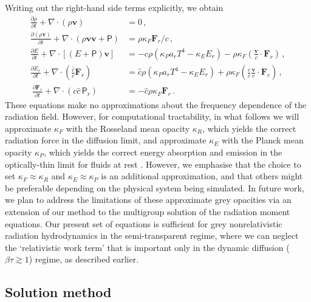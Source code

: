 \documentclass[fleqn,usenatbib]{mnras}
\newcommand{\vc}[1]{{\mathbf{#1}}}
\begin{document}
Writing out the right-hand side terms explicitly, we obtain
\begin{align}
    \label{eq:hydro_continuity}
    \frac{\partial \rho}{\partial t} + \nabla \cdot (\rho \vc{v}) &= 0 \, , \\
    \label{eq:hydro_momentum}
    \frac{\partial (\rho \vc{v})}{\partial t} + \nabla \cdot (\rho \vc{v} \vc{v} + \mathsf{P}) &= \rho \kappa_F {\vc{F}_r / c} \, , \\
    \label{eq:hydro_energy}
    \frac{\partial E}{\partial t} + \nabla \cdot \left[(E + \mathsf{P})\vc{v}\right] &= -c \rho (\kappa_P a_r T^4 - \kappa_E E_r) - \rho \kappa_F \left( \frac{\vc{v}}{c} \cdot \vc{F}_r \right) \, , \\
    \label{eq:rad_energy}
    \frac{\partial E_r}{\partial t} + \nabla \cdot \left( \frac{\hat c}{c} \vc{F}_r \right) &= \hat c \rho \left(\kappa_P a_r T^4 - \kappa_E E_r \right) + \rho \kappa_F \left( \frac{\hat c}{c} \frac{\vc{v}}{c} \cdot \vc{F}_r \right) \, , \\\
    \label{eq:rad_flux}
    \frac{\partial \vc{F}_r}{\partial t} + \nabla \cdot (c \hat c \, \mathsf{P}_r) &= -\hat c \rho \kappa_F \vc{F}_r \, .
\end{align}
These equations make no approximations about the frequency dependence of the radiation field. However, for computational tractability, in what follows we will approximate $\kappa_F$ with the Rosseland mean opacity $\kappa_R$, which yields the correct radiation force in the diffusion limit, and approximate $\kappa_E$ with the Planck mean opacity $\kappa_P$, which yields the correct energy absorption and emission in the optically-thin limit for fluids at rest \citep{Mihalas_1984}. However, we emphasise that the choice to set $\kappa_F \approx \kappa_R$ and $\kappa_E \approx \kappa_P$ is an additional approximation, and that others might be preferable depending on the physical system being simulated.  In future work, we plan to address the limitations of these approximate grey opacities via an extension of our method to the multigroup solution of the radiation moment equations.  Our present set of equations is sufficient for grey nonrelativistic radiation hydrodynamics in the semi-transparent regime, where we can neglect the `relativistic work term' that is important only in the dynamic diffusion ($\beta \tau \gtrsim 1$) regime, as described earlier.

\subsection{Solution method}
\end{document}
